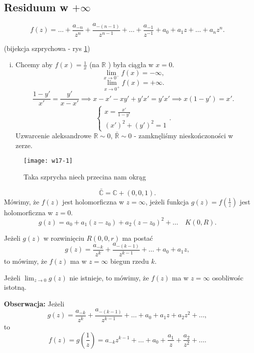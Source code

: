 \documentclass[../main.tex]{subfiles}
\begin{document}
\subsection{Residuum w $+\infty$ }
\[
    f(z) = \ldots + \frac{a_{-n}}{z^n} + \frac{a_{-(n-1)}}{z^{n-1}} + \ldots + \frac{a_{-1}}{z^{-1}} + a_0 + a_1 z + \ldots + a_n z^n
.\]
\begin{przyklad}(bijekcja szprychowa - rys \ref{fig:w17-1})
    \begin{enumerate}[i)]
        \item  Chcemy aby $f(x) = \frac{1}{x}$ (na $\mathbb{R}$ ) była ciągła w $x = 0$.
            \[
                \lim\limits_{x\to 0^-}f(x) = -\infty
            ,\]
        \[
            \lim_{x \to 0^+}f(x) = +\infty
        .\]
    \[
        \frac{1-y'}{x'} = \frac{y'}{x - x'} \implies x - x' - xy' + y'x' = y'x' \implies x(1-y') = x'
    .\]
\[
\begin{cases}
    x = \frac{x'}{1-y'}\\ \left(x'\right)^2 + \left(y'\right)^2 = 1
\end{cases}
.\]
Uzwarcenie aleksandrowe $\mathbb{R}\sim 0$, $\bar{\mathbb{R}} \sim 0$ - zamknęliśmy nieskończoności w zerze.
    \end{enumerate}
    \begin{figure}[h]
        \centering
        \texttt{[image: w17-1]}
        \caption{Taka szprycha niech przecina nam okrąg}
        \label{fig:w17-1}
    \end{figure}
\end{przyklad}

\begin{definicja}
    \[
        \bar{\mathbb{C}} = \mathbb{C} + (0,0,1)
    .\]
Mówimy, że $f(z)$ jest holomorficzna w $z = \infty$, jeżeli funkcja $g(z) = f(\frac{1}{z})$ jest holomorficzna w $z = 0$.
 \[
     g(z) = a_0 + a_1(z-z_0) + a_2(z-z_0)^2 + \ldots \quad K(0,R)
.\]
\end{definicja}
\begin{definicja}
Jeżeli  $g(z)$ w rozwinięciu $R(0,0,r)$ ma postać
\[
    g(z) = \frac{a_{-k}}{z^k} + \frac{a_{-(k-1)}}{z^{k-1}} + \ldots + a_0 + a_1z
,\]
to mówimy, że $f(z)$ ma w $z = \infty$ biegun rzedu $k$.
\end{definicja}
\begin{definicja}
    Jeżeli $\lim_{z \to 0}g(z)$ nie istnieje, to mówimy, że $f(z)$ ma w $z = \infty$ osobliwośc istotną.
\end{definicja}
\textbf{Obserwacja:} Jeżeli
\[
    g(z) = \frac{a_{-k}}{z^k} + \frac{a_{-(k-1)}}{z^{k-1}} + \ldots + a_0 + a_1z + a_2z^2 + \ldots
,\]
to
\[
    f(z) = g\left(\frac{1}{z}\right) = a_{-k}z^{k-1} + \ldots + a_0 + \frac{a_1}{z} + \frac{a_2}{z^2} + \ldots
.\]
\end{document}
